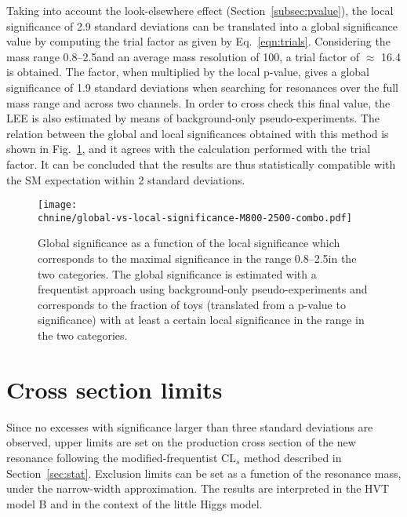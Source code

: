 Taking into account the look-elsewhere effect (Section~\ref{subsec:pvalue}), the local significance of 2.9 standard deviations can be translated into a global significance value by computing the trial factor as given by Eq.~\ref{eqn:trials}. 
Considering the mass range 0.8--2.5\TeV and an average mass resolution of 100\GeV, a trial factor of $\approx$ 16.4 is obtained. The factor, when multiplied by the local p-value, gives a global significance of 1.9 standard deviations
when searching for resonances over the full mass range and across two channels.
In order to cross check this final value, the LEE is also estimated by means of background-only pseudo-experiments. The relation between the global and local significances obtained with this method is shown in Fig.~\ref{fig:sigGlobWH},
and it agrees with the calculation performed with the trial factor.
It can be concluded that the results are thus statistically compatible with the SM expectation within 2 standard deviations.

\begin{figure}[!htb]
\centering
     \texttt{[image: \\chnine/global-vs-local-significance-M800-2500-combo.pdf]}
\caption{
  Global significance as a function of the local significance which corresponds to the maximal significance in the \mWH range 0.8--2.5\TeV in the two categories. The global significance is estimated with a frequentist approach using background-only pseudo-experiments and corresponds to the fraction of toys (translated from a p-value to significance) with at least a certain local significance in the \mWH range in the two categories.
}
\label{fig:sigGlobWH}
\end{figure}

\section{Cross section limits}

Since no excesses with significance larger than three standard deviations are observed, upper limits are set on the production cross section of the new resonance following the modified-frequentist $\mathrm{CL}_s$ method
described in Section~\ref{sec:stat}. Exclusion limits can be set as a function of the \Wpr resonance mass, under the narrow-width approximation.
The results are interpreted in the HVT model B and in the context of the little Higgs model.\\

